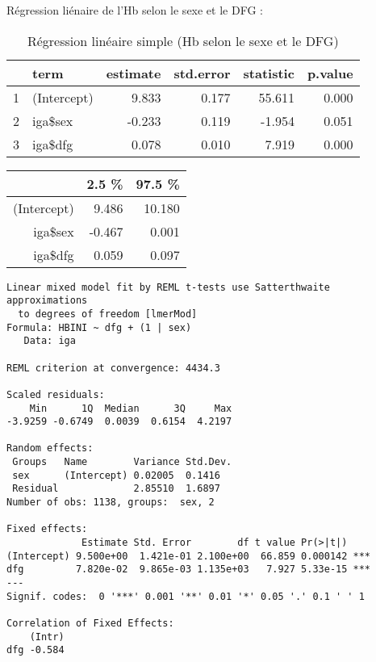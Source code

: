 \documentclass[11pt,a4paper]{article}\usepackage[]{graphicx}\usepackage[]{color}
\makeatletter
\newenvironment{kframe}{%
 \def\at@end@of@kframe{}%
 \ifinner\ifhmode%
  \def\at@end@of@kframe{\end{minipage}}%
  \begin{minipage}{\columnwidth}%
 \fi\fi%
 \def\FrameCommand##1{\hskip\@totalleftmargin \hskip-\fboxsep
 \colorbox{shadecolor}{##1}\hskip-\fboxsep
     \hskip-\linewidth \hskip-\@totalleftmargin \hskip\columnwidth}%
 \MakeFramed {\advance\hsize-\width
   \@totalleftmargin\z@ \linewidth\hsize
   \@setminipage}}%
 {\par\unskip\endMakeFramed%
 \at@end@of@kframe}
\newenvironment{knitrout}{}{} %
\makeatother
\begin{document}
Régression liénaire de l'Hb selon le sexe et le DFG :
\begin{table}[H]
\centering
\begin{tabular}{rlrrrr}
  \hline
 & term & estimate & std.error & statistic & p.value \\ 
  \hline
1 & (Intercept) & 9.833 & 0.177 & 55.611 & 0.000 \\ 
  2 & iga\$sex & -0.233 & 0.119 & -1.954 & 0.051 \\ 
  3 & iga\$dfg & 0.078 & 0.010 & 7.919 & 0.000 \\ 
   \hline
\end{tabular}
\caption{Régression linéaire simple (Hb selon le sexe et le DFG)} 
\end{table}
\begin{table}[ht]
\centering
\begin{tabular}{rrr}
  \hline
 & 2.5 \% & 97.5 \% \\ 
  \hline
(Intercept) & 9.486 & 10.180 \\ 
  iga\$sex & -0.467 & 0.001 \\ 
  iga\$dfg & 0.059 & 0.097 \\ 
   \hline
\end{tabular}
\end{table}


\begin{knitrout}
\color{fgcolor}\begin{kframe}
\begin{verbatim}
Linear mixed model fit by REML t-tests use Satterthwaite approximations
  to degrees of freedom [lmerMod]
Formula: HBINI ~ dfg + (1 | sex)
   Data: iga

REML criterion at convergence: 4434.3

Scaled residuals: 
    Min      1Q  Median      3Q     Max 
-3.9259 -0.6749  0.0039  0.6154  4.2197 

Random effects:
 Groups   Name        Variance Std.Dev.
 sex      (Intercept) 0.02005  0.1416  
 Residual             2.85510  1.6897  
Number of obs: 1138, groups:  sex, 2

Fixed effects:
             Estimate Std. Error        df t value Pr(>|t|)    
(Intercept) 9.500e+00  1.421e-01 2.100e+00  66.859 0.000142 ***
dfg         7.820e-02  9.865e-03 1.135e+03   7.927 5.33e-15 ***
---
Signif. codes:  0 '***' 0.001 '**' 0.01 '*' 0.05 '.' 0.1 ' ' 1

Correlation of Fixed Effects:
    (Intr)
dfg -0.584
\end{verbatim}
\end{kframe}
\end{knitrout}
\end{document}
